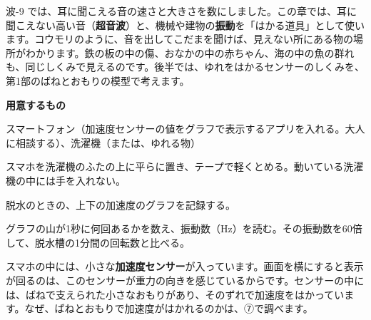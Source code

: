 \noindent 波-9 では、耳に聞こえる音の速さと大きさを数にしました。この章では、耳に聞こえない高い音（\textbf{超音波}）と、機械や建物の\textbf{振動}を「はかる道具」として使います。コウモリのように、音を出してこだまを聞けば、見えない所にある物の場所がわかります。鉄の板の中の傷、おなかの中の赤ちゃん、海の中の魚の群れも、同じしくみで見えるのです。後半では、ゆれをはかるセンサーのしくみを、第1部のばねとおもりの模型で考えます。

\begin{yattemiyou}[スマホで洗濯機のゆれをはかろう]
\textbf{用意するもの}\par
スマートフォン（加速度センサーの値をグラフで表示するアプリを入れる。大人に相談する）、洗濯機（または、ゆれる物）
\begin{enumerate}[label={\bkcircled[bkGreen]{\arabic*}}, leftmargin=2.4\zw, itemsep=1pt, topsep=2pt]
\item スマホを洗濯機のふたの上に平らに置き、テープで軽くとめる。動いている洗濯機の中には手を入れない。
\item 脱水のときの、上下の加速度のグラフを記録する。
\item グラフの山が1秒に何回あるかを数え、振動数（Hz）を読む。その振動数を60倍して、脱水槽の1分間の回転数と比べる。
\end{enumerate}
\end{yattemiyou}

\noindent スマホの中には、小さな\textbf{加速度センサー}が入っています。画面を横にすると表示が回るのは、このセンサーが重力の向きを感じているからです。センサーの中には、ばねで支えられた小さなおもりがあり、そのずれで加速度をはかっています。なぜ、ばねとおもりで加速度がはかれるのかは、⑦で調べます。

\begin{omoidasou}
\end{omoidasou}

